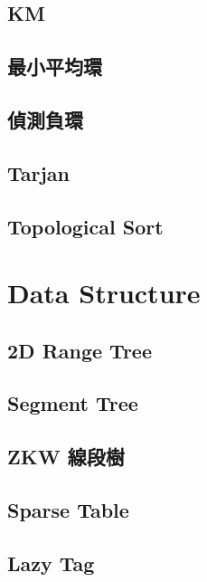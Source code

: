 \subsection{KM}

\subsection{最小平均環}

\subsection{偵測負環}

\subsection{Tarjan}

\subsection{Topological Sort}


\section{Data Structure}

\subsection{2D Range Tree}


\subsection{Segment Tree}

\subsection{ZKW 線段樹}

\subsection{Sparse Table}

\subsection{Lazy Tag}

